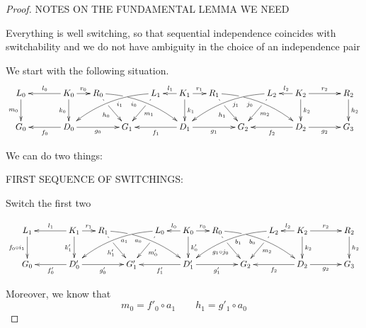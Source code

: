 \documentclass[a4paper,UKenglish,cleveref,pdftex,thm-restate,numberwithinsect,anonymous]{lipics}
\def\G{\textbf {\textup{G}}}
\begin{document}
\lemSwitchConfluence*
\label{lemSwitchConfluence-proof}

\begin{proof}
NOTES ON THE FUNDAMENTAL LEMMA WE NEED

Everything is well switching, so that sequential independence coincides with switchability and we do not have ambiguity in the choice of an independence pair


We start with the following situation.
\[\xymatrix@C=15pt{L_0\ar[d]_{m_0}&& K_0 \ar[d]_{k_0}\ar[ll]_{l_0} \ar[r]^{r_0} & R_0 \ar@/^.35cm/[drrr]_(.4){i_0}|(.285)\hole \ar[dr]|(.28)\hole_{h_0} && L_1 \ar@/_.35cm/[dlll]^(.4){i_1} \ar[dl]|(.28)\hole^{m_1}& K_1 \ar[d]^{k_1}\ar[l]_{l_1} \ar[r]^{r_1} & R_1 \ar[dr]|(.28)\hole_{h_1} \ar@/^.35cm/[drrr]_(.4){j_0}|(.285)\hole  && L_2 \ar@/_.35cm/[dlll]^(.4){j_1} \ar[dl]|(.28)\hole^{m_2}& K_2 \ar[d]^{k_2}\ar[l]_{l_2} \ar[rr]^{r_2} && R_2 \ar[d]^{h_2} \\G_0 && \ar[ll]^{f_0} D_0 \ar[rr]_{g_0}&& G_1  && \ar[ll]^{f_1} D_1 \ar[rr]_{g_1}&& G_2 && \ar[ll]^{f_2} D_2 \ar[rr]_{g_2}&& G_3 }\]

We can do two things:

FIRST SEQUENCE OF SWITCHINGS:

Switch the first two


\[\xymatrix@C=15pt{L_1\ar[d]_{f_0\circ i_1}&& K_1 \ar[d]_{k'_1}\ar[ll]_{l_1} \ar[r]^{r_1} & R_1 \ar@/^.35cm/[drrr]_(.4){a_0}|(.285)\hole \ar[dr]|(.28)\hole_{h'_1} && L_0 \ar@/_.35cm/[dlll]^(.4){a_1} \ar[dl]|(.28)\hole^{m'_0}& K_0 \ar[d]^{k'_0}\ar[l]_{l_0} \ar[r]^{r_0} & R_0 \ar[dr]|(.28)\hole_{g_1\circ j_0} \ar@/^.35cm/[drrr]_(.4){b_0}|(.285)\hole  && L_2 \ar@/_.35cm/[dlll]^(.4){b_1} \ar[dl]|(.28)\hole^{m_2}& K_2 \ar[d]^{k_2}\ar[l]_{l_2} \ar[rr]^{r_2} && R_2 \ar[d]^{h_2} \\G_0 && \ar[ll]^{f'_0} D'_0 \ar[rr]_{g'_0}&& G'_1  && \ar[ll]^{f'_1} D'_1 \ar[rr]_{g'_1}&& G_2 && \ar[ll]^{f_2} D_2 \ar[rr]_{g_2}&& G_3 }\]

Moreover, we know that
\[m_0=f'_0\circ a_1 \qquad h_1=g'_1\circ a_0\]


\end{proof}
\end{document}
